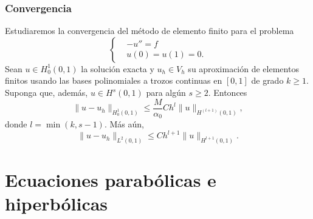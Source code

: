 \documentclass[11pt,letterpaper]{report}
\begin{document}
\subsection{Convergencia}

Estudiaremos la convergencia del método de elemento finito para el
problema
\begin{equation}
  \left\{
    \begin{aligned}
      & -u'' = f
      \\
      & u(0) = u(1)=0.
    \end{aligned}
  \right.
\end{equation}
Sean $u\in H_{0}^{1}(0,1)$ la solución exacta y $u_h\in V_h$ su
aproximación de elementos finitos usando las bases polinomiales a
trozos continuas en $[0,1]$ de grado $k\geq 1$. Suponga que, además,
$u\in H^{s}(0,1)$ para algún $s\geq 2$. Entonces
\begin{equation}
  \|u-u_h\|_{H^{1}_0(0,1)}
  \leq
  \frac{M}{\alpha_0} Ch^l\|u\|_{H^{(l+1)}(0,1)}
,\end{equation}
donde $l=\min(k,s-1)$. Más aún,
\begin{equation}
  \|u-u_h\|_{L^{2}(0,1)}
  \leq
  Ch^{l+1}\|u\|_{H^{l+1}(0,1)}
.\end{equation}

\chapter{Ecuaciones parabólicas e hiperbólicas}
\end{document}
